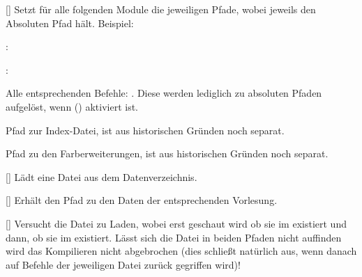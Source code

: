 %
%
%

[\cmdlist{}]
Setzt für alle folgenden Module die jeweiligen Pfade, wobei  jeweils den Absoluten Pfad hält. Beispiel:
\begin{ditemize}\narrowitems
    \item {}: \newline\lstshowcmd{\LILLYxPATHxGRAPHICS}
    \item {}: \newline\lstshowcmd{\LILLYxABSPATHxGRAPHICS}
\end{ditemize}\def\stdloperation#1{\blankcmd{LILLYxPATHx#1} (\blankcmd{LILLYxABSPATHx#1})\anothercmd*[1.0.4]{LILLYxPATHx#1}\anothercmd*[1.0.4]{LILLYxABSPATHx#1}}
Alle entsprechenden Befehle: . Diese werden lediglich zu absoluten Pfaden aufgelöst, wenn  () aktiviert ist.

%
%
%

Pfad zur Index-Datei, ist aus historischen Gründen noch separat.

%
%
%

Pfad zu den Farberweiterungen, ist aus historischen Gründen noch separat.

%
%
%

[]
Lädt eine Datei aus dem Datenverzeichnis.

%
%
%

[]
Erhält den Pfad zu den Daten der entsprechenden Vorlesung.

%
%
%

[]
Versucht die Datei  zu Laden, wobei erst geschaut wird ob sie im  existiert und dann, ob sie im  existiert. Lässt sich die Datei in beiden Pfaden nicht auffinden wird das Kompilieren nicht abgebrochen (dies schließt natürlich aus, wenn danach auf Befehle der jeweiligen Datei zurück gegriffen wird)!

%
%
%
%
%

